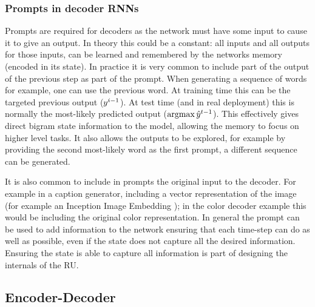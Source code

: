 \documentclass[12pt,parskip]{komatufte}
\begin{document}
\subsubsection{Prompts in decoder RNNs}


Prompts are required for decoders as the network must have some input to cause it to give an output.
In theory this could be a constant: all inputs and all outputs for those inputs, can be learned and remembered by the networks memory (encoded in its state).
In practice it is very common to include part of the output of the previous step as part of the prompt.
When generating a sequence of words for example, one can use the previous word.
At training time this can be the targeted previous output ($\n y_{i-1}$).
At test time (and in real deployment) this is normally the most-likely predicted output ($\argmax \n \hat{y}_{t-1}$).
This effectively gives direct bigram state information to the model,
allowing the memory to focus on higher level tasks.
It also allows the outputs to be explored, for example by providing the second most-likely word as the first prompt, a different sequence can be generated.

It is also common to include in prompts the original input to the decoder.
For example in a caption generator, including a vector representation of the image (for example an Inception Image Embedding ); in the color decoder example this would be including the original color representation.
In general the prompt can be used to add information to the network ensuring that each time-step can do as well as possible, even if the state does not capture all the desired information.
Ensuring the state is able to capture all information is part of designing the internals of the RU.

\subsection{Encoder-Decoder}
\end{document}
